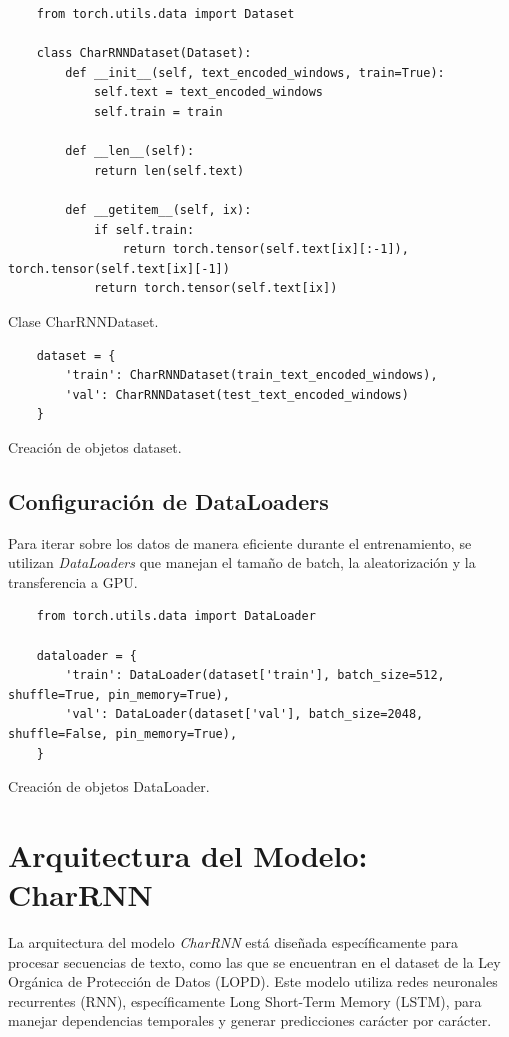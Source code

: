 \documentclass{article}
\begin{document}
\begin{listing}[H]
\begin{verbatim}
    from torch.utils.data import Dataset

    class CharRNNDataset(Dataset):
        def __init__(self, text_encoded_windows, train=True):
            self.text = text_encoded_windows
            self.train = train

        def __len__(self):
            return len(self.text)

        def __getitem__(self, ix):
            if self.train:
                return torch.tensor(self.text[ix][:-1]), torch.tensor(self.text[ix][-1])
            return torch.tensor(self.text[ix])
\end{verbatim}
\caption{Clase CharRNNDataset.}
\end{listing}

\begin{listing}[H]
\begin{verbatim}
    dataset = {
        'train': CharRNNDataset(train_text_encoded_windows),
        'val': CharRNNDataset(test_text_encoded_windows)
    }
\end{verbatim}
\caption{Creación de objetos dataset.}
\end{listing}

\subsection{Configuración de DataLoaders}
Para iterar sobre los datos de manera eficiente durante el entrenamiento, se utilizan \textit{DataLoaders} que manejan el tamaño de batch, la aleatorización y la transferencia a GPU.

\begin{listing}[H]
\begin{verbatim}
    from torch.utils.data import DataLoader

    dataloader = {
        'train': DataLoader(dataset['train'], batch_size=512, shuffle=True, pin_memory=True),
        'val': DataLoader(dataset['val'], batch_size=2048, shuffle=False, pin_memory=True),
    }
\end{verbatim}
\caption{Creación de objetos DataLoader.}
\end{listing}

\newpage

\section{Arquitectura del Modelo: CharRNN}
La arquitectura del modelo \textit{CharRNN} está diseñada específicamente para procesar secuencias de texto, como las que se encuentran en el dataset de la Ley Orgánica de Protección de Datos (LOPD). Este modelo utiliza redes neuronales recurrentes (RNN), específicamente Long Short-Term Memory (LSTM), para manejar dependencias temporales y generar predicciones carácter por carácter.
\end{document}
